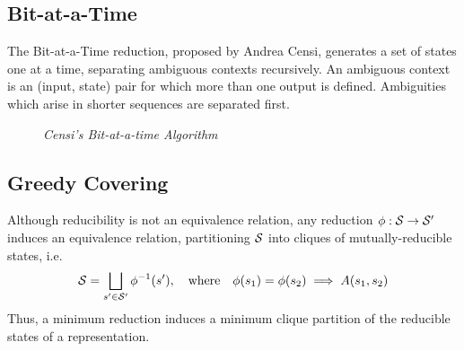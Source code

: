 \subsection{Bit-at-a-Time}
The Bit-at-a-Time reduction, proposed by Andrea Censi, generates a set of states one at a time,
separating ambiguous contexts recursively.  An ambiguous context is an (input, state) pair for
which more than one output is defined.  Ambiguities which arise in shorter sequences are separated first.
\begin{figure}
\centering
{}
\caption{\emph{Censi's Bit-at-a-time Algorithm}}
\end{figure}
 
\subsection{Greedy Covering}

Although reducibility is not an equivalence relation, 
any reduction $\phi:\S\to\S\1$ induces an equivalence relation,
partitioning $\S$ into cliques of mutually-reducible states, i.e.
\begin{equation}
\S = \bigsqcup_{s\1\in\S\1}\phi\inv(s\1),\qtx{where}\phi(s_1)=\phi(s_2)\implies A(s_1,s_2)
\end{equation}
Thus, a minimum 
reduction
induces a minimum clique partition of the
reducible states of a representation.
